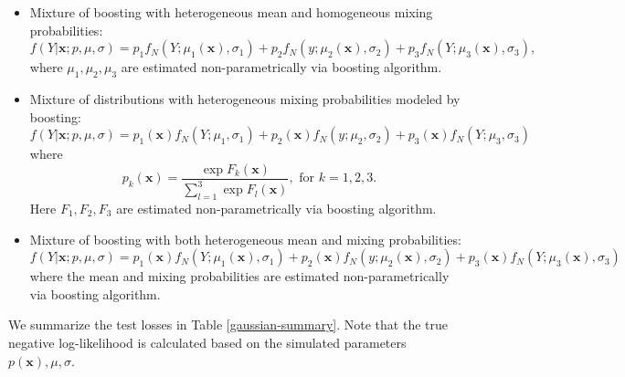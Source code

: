 \documentclass[11pt]{article}
\numberwithin{equation}{section}
\def\bx{\boldsymbol{x}}
\begin{document}
\begin{itemize}
\item Mixture of boosting with heterogeneous mean and homogeneous mixing probabilities:
\begin{equation}\label{gaussian-bst-mu}
	f(Y|\bx;p,\mu,\sigma)=p_1f_N(Y;\mu_1(\bx),\sigma_1)+p_2f_N(y;\mu_2(\bx),\sigma_2)+p_3f_N(Y;\mu_3(\bx),\sigma_3),
\end{equation}
where $\mu_1,\mu_2,\mu_3$ are estimated non-parametrically via boosting algorithm.

\item Mixture of distributions with heterogeneous mixing probabilities modeled by boosting:
\begin{equation}\label{gaussian-bst-p}
	f(Y|\bx;p,\mu,\sigma)=p_1(\bx)f_N(Y;\mu_1,\sigma_1)+p_2(\bx)f_N(y;\mu_2,\sigma_2)+p_3(\bx)f_N(Y;\mu_3,\sigma_3)
\end{equation}
where
\begin{equation}\label{bst-p}
	p_k(\bx)=\frac{\exp{F_k(\bx)}}{\sum_{l=1}^{3}\exp{F_l(\bx)}}, \text{ for } k=1,2,3.
\end{equation}
Here $F_1,F_2,F_3$ are estimated non-parametrically via boosting algorithm.

\item Mixture of boosting with both heterogeneous mean and mixing probabilities:
\begin{equation}\label{gaussian-bst-b}
	f(Y|\bx;p,\mu,\sigma)=p_1(\bx)f_N(Y;\mu_1(\bx),\sigma_1)+p_2(\bx)f_N(y;\mu_2(\bx),\sigma_2)+p_3(\bx)f_N(Y;\mu_3(\bx),\sigma_3)
\end{equation}
where the mean and mixing probabilities are estimated non-parametrically via boosting algorithm.

\end{itemize}
We summarize the test losses in Table \ref{gaussian-summary}. 
Note that the true negative log-likelihood is calculated based on the simulated parameters $p(\bx), \mu,\sigma$.
\end{document}
